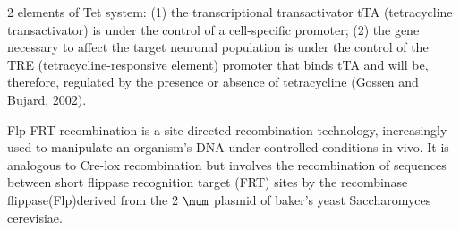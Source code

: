   2 elements of Tet system: (1)  the transcriptional transactivator tTA
  (tetracycline transactivator) is under the control of a cell-specific
  promoter; (2) the gene necessary to affect the target neuronal population is
  under the control of the TRE (tetracycline-responsive element) promoter that
  binds tTA and will be, therefore, regulated by the presence or absence of
  tetracycline (Gossen and Bujard, 2002).


Flp-FRT recombination is a site-directed recombination technology, increasingly
used to manipulate an organism's DNA under controlled conditions in vivo. It is
analogous to Cre-lox recombination but involves the recombination of sequences
between short flippase recognition target (FRT) sites by the recombinase
flippase(Flp)derived from the 2 $\mum$ plasmid of baker's yeast Saccharomyces
cerevisiae.

